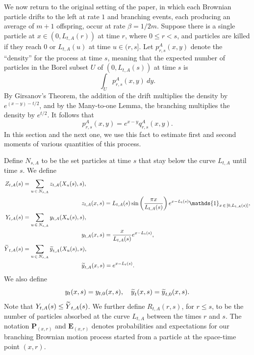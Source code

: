 \documentclass[10pt]{amsart}
\theoremstyle{definition}\newtheorem{defi}[theo]{Definition}\newtheorem{rema}[theo]{Remark}\newtheorem{exam}[theo]{Example}\newtheorem{exem}[theo]{Example}\newtheorem{nota}[theo]{Notation}
\newcommand*\E{\mathbf{E}}
\renewcommand*\P{\mathbf{P}}
\newcommand{\1} {\mathds{1}}
\let\oldtilde\tilde
\renewcommand*{\tilde}[1]{\mathchoice{\widetilde{#1}}{\widetilde{#1}}{\oldtilde{#1}}{\oldtilde{#1}}}
\begin{document}
We now return to the original setting of the paper, in which each Brownian particle drifts to the left at rate $1$ and branching events, each producing an average of $m+1$ offspring, occur at rate $\beta = 1/2m$. Suppose there is a single particle at $x \in (0, L_{t,A}(r))$ at time $r$, where $0 \leq r < s$, and particles are killed if they reach $0$ or $L_{t,A}(u)$ at time $u \in (r, s]$. Let $p_{r,s}^A(x,y)$ denote the ``density'' for the process at time $s$, meaning that the expected number of particles in the Borel subset $U$ of $(0, L_{t,A}(s))$ at time $s$ is
\[
\int_U p_{r,s}^A(x,y) \: dy.
\]
By Girsanov's Theorem, the addition of the drift multiplies the density by $e^{(x - y) - t/2}$, and by the Many-to-one Lemma, the branching multiplies the density by $e^{t/2}$. It follows that
\[
p_{r,s}^A(x,y) = e^{x-y} q_{r,s}^A(x,y).
\]
In this section and the next one, we use this fact to estimate first and second moments of various quantities of this process.

Define $N_{s,A}$ to be the set particles at time $s$ that stay below the curve $L_{t,A}$ until time $s$. We define
\begin{align*}
 Z_{t,A}(s) &= \sum_{u\,\in\,N_{s,A}} z_{t,A}(X_u(s),s),\\
&\mkern180mu z_{t,A}(x,s) = L_{t,A}(s)\sin\left(\frac{\pi x}{L_{t,A}(s)}\right)e^{x-L_t(s)}\1_{x\,\in\,\left[0,L_{t,A}(s)\right]},\\
Y_{t,A}(s) &= \sum_{u\,\in\,N_{s,A}} y_{t,A}(X_u(s),s),\\
&\mkern180mu y_{t,A}(x,s) = \frac x {L_{t,A}(s)} e^{x-L_t(s)}, \\
{\tilde Y}_{t,A}(s) &= \sum_{u\,\in\,N_{s,A}} {\tilde y}_{t,A}(X_u(s), s),\\
&\mkern180mu {\tilde y}_{t,A}(x,s) = e^{x-L_t(s)}.
\end{align*}
We also define
\[
y_t(x,s) = y_{t,0}(x,s), \quad {\tilde y}_t(x,s) = {\tilde y}_{t,0}(x,s).
\]
Note that $Y_{t,A}(s) \leq {\tilde Y}_{t,A}(s)$. We further define $R_{t,A}(r,s)$, for $r\le s$, to be the number of particles absorbed at the curve $L_{t,A}$ between the times $r$ and $s$. The notation $\P_{(x,r)}$ and $\E_{(x,r)}$ denotes probabilities and expectations for our branching Brownian motion process started from a particle at the space-time point $(x,r)$.
\end{document}

